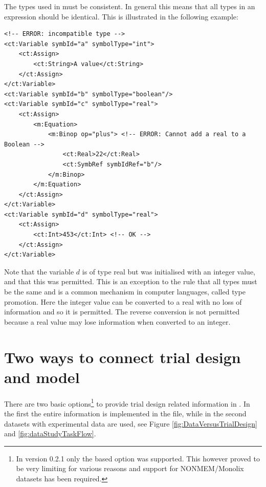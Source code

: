The types used in \pharmml must be consistent. In general this means that
all types in an expression should be identical. This is illustrated in
the following example:
%
\lstset{language=XML}
\begin{lstlisting}
<!-- ERROR: incompatible type -->
<ct:Variable symbId="a" symbolType="int">
    <ct:Assign>
        <ct:String>A value</ct:String>
    </ct:Assign>
</ct:Variable>
<ct:Variable symbId="b" symbolType="boolean"/>
<ct:Variable symbId="c" symbolType="real">
    <ct:Assign>
        <m:Equation>
            <m:Binop op="plus"> <!-- ERROR: Cannot add a real to a Boolean -->
                <ct:Real>22</ct:Real>
                <ct:SymbRef symbIdRef="b"/>
            </m:Binop>
        </m:Equation>
    </ct:Assign>
</ct:Variable>
<ct:Variable symbId="d" symbolType="real">
    <ct:Assign>
        <ct:Int>453</ct:Int> <!-- OK -->
    </ct:Assign>
</ct:Variable>
\end{lstlisting}
%
Note that the variable $d$ is of type real but was
initialised with an integer value, and that this was permitted. This
is an exception to the rule that all types must be the same and is
a common mechanism in computer languages, called type promotion. Here
the integer value can be converted to a real with no loss of
information and so it is permitted. The reverse conversion is not
permitted because a real value may lose information when converted to
an integer.


\section{Two ways to connect trial design and model}
\label{subsec:twoModes}
There are two basic options\footnote{In version 0.2.1 only the 
based option was supported. This however proved to be very limiting for 
various reasons and support for NONMEM/Monolix datasets has been required.}  
to provide trial design related information in \pml. In the first the entire information 
is implemented in the \pml file, while in the second datasets with experimental 
data are used, see Figure \ref{fig:DataVersusTrialDesign} and \ref{fig:dataStudyTaskFlow}.

